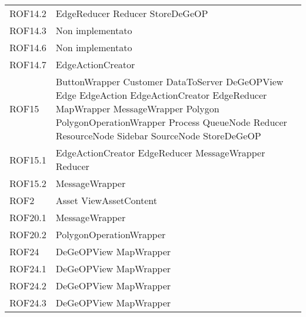 \begin{longtable}{p{2.5cm}!{\VRule[1pt]}p{5cm}}
	ROF14.2 & EdgeReducer \newline Reducer \newline StoreDeGeOP\\
	ROF14.3 & Non implementato\\
	ROF14.6 & Non implementato\\
	ROF14.7 & EdgeActionCreator\\
	ROF15 & ButtonWrapper \newline Customer \newline DataToServer \newline DeGeOPView \newline Edge \newline EdgeAction \newline EdgeActionCreator \newline EdgeReducer \newline MapWrapper \newline MessageWrapper \newline Polygon \newline PolygonOperationWrapper \newline Process \newline QueueNode \newline Reducer \newline ResourceNode \newline Sidebar \newline SourceNode \newline StoreDeGeOP\\
	ROF15.1 & EdgeActionCreator \newline EdgeReducer \newline MessageWrapper \newline Reducer\\
	ROF15.2 & MessageWrapper\\
	ROF2 & Asset \newline ViewAssetContent\\
	ROF20.1 & MessageWrapper\\
	ROF20.2 & PolygonOperationWrapper\\
	ROF24 & DeGeOPView \newline MapWrapper\\
	ROF24.1 & DeGeOPView \newline MapWrapper\\
	ROF24.2 & DeGeOPView \newline MapWrapper\\
	ROF24.3 & DeGeOPView \newline MapWrapper\\

\end{longtable}
